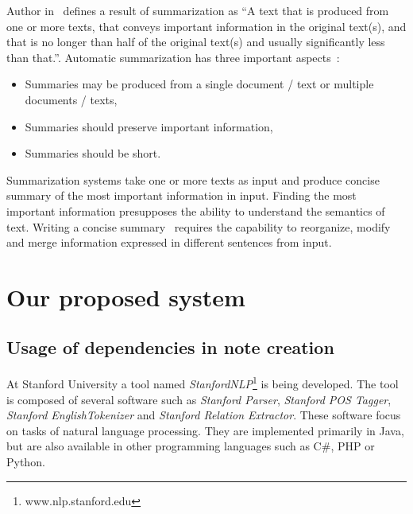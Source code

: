 \documentclass{iitsrc}
\begin{document}
	Author in~\cite{Radev2002} defines a result of summarization as ``A text that is produced from one or more texts, that conveys important information in the original text(s), and that is no longer than half of the original text(s) and usually	significantly less than that.''. Automatic summarization has three important aspects~\cite{Das07asurvey}:
	\begin{itemize}
		\item Summaries may be produced from a single document / text or multiple documents / texts,
		\item Summaries should preserve important information,
		\item Summaries should be short.
	\end{itemize}

	Summarization systems take one or more texts as input and produce concise summary of the most important information in input. Finding the most important information presupposes the ability to understand the semantics of text. Writing a concise summary~\cite{NenkovaMcKeownAutomaticSummarization} requires the capability to reorganize, modify and merge information expressed in different sentences from input.
	

\section{Our proposed system}
	\subsection{Usage of dependencies in note creation} \label{sub:dependencies_in_note_creation}
		At Stanford University a tool named \textit{StanfordNLP}\footnote{www.nlp.stanford.edu} is being developed. The tool is composed of several software such as \textit{Stanford Parser}, \textit{Stanford POS Tagger}, \textit{Stanford EnglishTokenizer} and \textit{Stanford Relation Extractor}. These software focus on tasks of natural language processing. They are implemented primarily in Java, but are also available in other programming languages such as C\#, PHP or Python.
	
\end{document}
